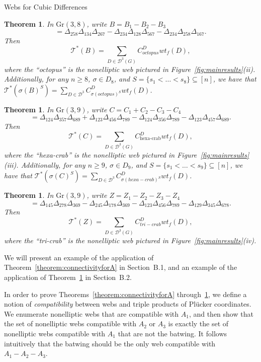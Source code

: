 \documentclass[11pt]{article}
\newtheorem{theorem}[theo]{Theorem}
\theoremstyle{definition}
\numberwithin{equation}{section}
\def\T {{\mathscr{T}^*}}
\def\Gr {{\textrm{Gr}}}
\numberwithin{equation}{section}
\begin{document}
\begin{subsection}{Webs for Cubic Differences}
\begin{theorem} \label{theorem:connectivityforB} 
In $\Gr(3,8)$, write $B=B_1-B_2-B_3$\[ = \Delta_{258}\Delta_{134}\Delta_{267} - \Delta_{234}\Delta_{128}\Delta_{567}-\Delta_{234}\Delta_{258}\Delta_{167}.\]
Then \[\T(B)=\sum_{D \in \mathcal{D}^3(G)} C_{octopus}^D wt_f(D),\]
where the ``octopus'' is the nonelliptic web pictured in Figure~\ref{fig:mainresults}(ii).
Additionally, for any $n \geq 8$, $\sigma \in D_8$, and $S=\{s_1<\dots<s_8\} \subseteq [n]$, we have that $\T(\sigma(B)^S)=\sum_{D \in \mathcal{D}^3} C_{\sigma(octopus)^S}^D wt_f(D)$.
\end{theorem}

\begin{theorem} \label{theorem:connectivityforC}
In $\Gr(3,9)$, write $C = C_1+C_2-C_3-C_4$\[= \Delta_{124}\Delta_{357}\Delta_{689} + \Delta_{123}\Delta_{456}\Delta_{789}- \Delta_{124}\Delta_{356}\Delta_{789} - \Delta_{123}\Delta_{457}\Delta_{689}.\]
Then \[\T(C)=\sum_{D \in \mathcal{D}^3(G)} C_{\textrm{hexa-crab}}^D wt_f(D),\]
where the ``hexa-crab'' is the nonelliptic web pictured in Figure~\ref{fig:mainresults}(iii).
Additionally, for any $n \geq 9$, $\sigma \in D_9$, and $S=\{s_1<\dots<s_9\} \subseteq [n]$, we have that $\T(\sigma(C)^S)=\sum_{D \in \mathcal{D}^3} C_{\sigma(hexa-crab)^S}^D wt_f(D)$.
\end{theorem}

\begin{theorem} \label{theorem:connectivityforZ}
In $\Gr(3,9)$, write $Z = Z_1 - Z_2 - Z_3 - Z_4 $ 
\[=\Delta_{145} \Delta_{278} \Delta_{369} - \Delta_{245} \Delta_{178} \Delta_{369} - \Delta_{123}\Delta_{456}\Delta_{789} - \Delta_{129}\Delta_{345}\Delta_{678}.\]
Then \[\T(Z)=\sum_{D \in \mathcal{D}^3(G)} C_{tri-crab}^D wt_f(D),\]
where the ``tri-crab'' is the nonelliptic web pictured in Figure~\ref{fig:mainresults}(iv).
\end{theorem}

We will present an example of the application of Theorem~\ref{theorem:connectivityforA} in Section~B.1, and an example of the application of Theorem~\ref{theorem:connectivityforB} in Section~B.2.

In order to prove Theorems~\ref{theorem:connectivityforA} through~\ref{theorem:connectivityforZ}, we define a notion of \textit{compatibility} between webs and triple products of Pl{\"u}cker coordinates. We enumerate nonelliptic webs that are compatible with $A_1$, and then show that the set of nonelliptic webs compatible with $A_2$ or $A_3$ is exactly the set of nonelliptic webs compatible with $A_1$ that are not the batwing. It follows intuitively that the batwing should be the only web compatible with $A_1-A_2-A_3$.


\end{subsection}
\end{document}
